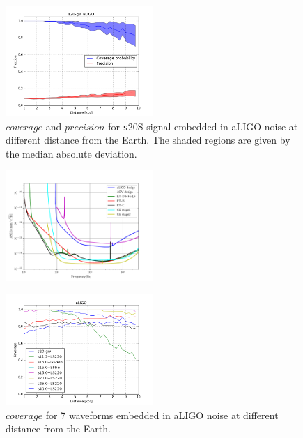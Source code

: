 \begin{figure}
  \centering
  \includegraphics[width=0.5\textwidth]{plots/s20-gw_covpbb_prec_aLIGO}
 \caption{$coverage$ and $precision$ for {\texttt s20S} signal embedded in aLIGO noise at different distance from the Earth. The shaded regions are given by the median absolute deviation.} \label{fig:s20results}
\end{figure}


\begin{figure}
 \centering
 \includegraphics[width=0.5\textwidth]{plots/spectrum}
 \caption{} \label{fig:spectrum}
\end{figure}

\begin{figure}
  \centering
  \includegraphics[width=0.5\textwidth]{plots/covppb_all_aLIGO}
 \caption{$coverage$ for 7 waveforms embedded in aLIGO noise at different distance from the Earth. } \label{fig:aLIGOall}
\end{figure}


